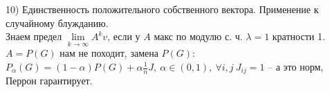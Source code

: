 10) Единственность положительного собственного вектора. Применение к случайному блужданию.\\

Знаем предел $\lim\limits_{k\to\infty}A^kv$, если у $ A $ макс по модулю с. ч. $\lambda=1$ кратности 1. $A=P(G)$ нам не походит, замена $P(G)$: $P_{\alpha}(G)=(1-\alpha) P(G) + \alpha\tfrac{1}{n}J,\ \alpha \in (0,1),\ \forall i,j\ J_{ij}=1 $ -- а это норм, Перрон гарантирует.\\
